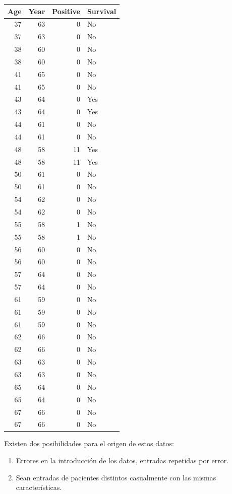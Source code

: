 \documentclass[
]{article}
\providecommand{\tightlist}{%
  \setlength{\itemsep}{0pt}\setlength{\parskip}{0pt}}
\begin{document}
\begin{tabular}{r|r|r|l}
\hline
Age & Year & Positive & Survival\\
\hline
37 & 63 & 0 & No\\
\hline
37 & 63 & 0 & No\\
\hline
38 & 60 & 0 & No\\
\hline
38 & 60 & 0 & No\\
\hline
41 & 65 & 0 & No\\
\hline
41 & 65 & 0 & No\\
\hline
43 & 64 & 0 & Yes\\
\hline
43 & 64 & 0 & Yes\\
\hline
44 & 61 & 0 & No\\
\hline
44 & 61 & 0 & No\\
\hline
48 & 58 & 11 & Yes\\
\hline
48 & 58 & 11 & Yes\\
\hline
50 & 61 & 0 & No\\
\hline
50 & 61 & 0 & No\\
\hline
54 & 62 & 0 & No\\
\hline
54 & 62 & 0 & No\\
\hline
55 & 58 & 1 & No\\
\hline
55 & 58 & 1 & No\\
\hline
56 & 60 & 0 & No\\
\hline
56 & 60 & 0 & No\\
\hline
57 & 64 & 0 & No\\
\hline
57 & 64 & 0 & No\\
\hline
61 & 59 & 0 & No\\
\hline
61 & 59 & 0 & No\\
\hline
61 & 59 & 0 & No\\
\hline
62 & 66 & 0 & No\\
\hline
62 & 66 & 0 & No\\
\hline
63 & 63 & 0 & No\\
\hline
63 & 63 & 0 & No\\
\hline
65 & 64 & 0 & No\\
\hline
65 & 64 & 0 & No\\
\hline
67 & 66 & 0 & No\\
\hline
67 & 66 & 0 & No\\
\hline
\end{tabular}

Existen dos posibilidades para el origen de estos datos:

\begin{enumerate}
\def\labelenumi{\arabic{enumi}.}
\tightlist
\item
  Errores en la introducción de los datos, entradas repetidas por error.
\item
  Sean entradas de pacientes distintos casualmente con las mismas
  características.
\end{enumerate}
\end{document}

